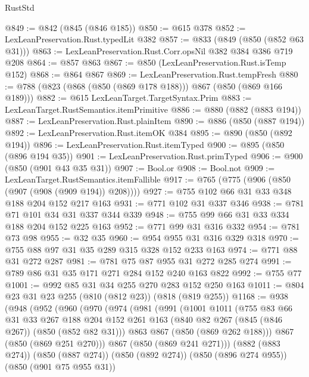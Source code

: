 \begin{lexlean}{RustStd}
\begin{coremodule}
{\begin{coremodule}
{{{{{@849 := @842 (@845 (@846 @185))
@850 := @615 @378
@852 := LexLeanPreservation.Rust.typedLit @382
@857 := @833 (@849 (@850 (@852 @63 @31)))
@863 := LexLeanPreservation.Rust.Corr.opsNil @382 @384 @386 @719 @208
@864 := @857 @863
@867 := @850 (LexLeanPreservation.Rust.isTemp @152)
@868 := @864 @867
@869 := LexLeanPreservation.Rust.tempFresh
@880 := @788 (@823 (@868 (@850 (@869 @178 @188))) @867 (@850 (@869 @166 @189)))
@882 := @615 LexLeanTarget.TargetSyntax.Prim
@883 := LexLeanTarget.RustSemantics.itemPrimitive
@886 := @880 (@882 (@883 @194))
@887 := LexLeanPreservation.Rust.plainItem
@890 := @886 (@850 (@887 @194))
@892 := LexLeanPreservation.Rust.itemOK @384
@895 := @890 (@850 (@892 @194))
@896 := LexLeanPreservation.Rust.itemTyped
@900 := @895 (@850 (@896 @194 @35))
@901 := LexLeanPreservation.Rust.primTyped
@906 := @900 (@850 (@901 @43 @35 @31))
@907 := Bool.or
@908 := Bool.not
@909 := LexLeanTarget.RustSemantics.itemFallible
@917 := @765 (@775 (@906 (@850 (@907 (@908 (@909 @194)) @208))))
@927 := @755 @102 @66 @31 @33 @348 @188 @204 @152 @217 @163
@931 := @771 @102 @31 @337 @346
@938 := @781 @71 @101 @34 @31 @337 @344 @339
@948 := @755 @99 @66 @31 @33 @334 @188 @204 @152 @225 @163
@952 := @771 @99 @31 @316 @332
@954 := @781 @73 @98
@955 := @32 @35
@960 := @954 @955 @31 @316 @329 @318
@970 := @755 @88 @97 @31 @35 @289 @315 @328 @152 @233 @163
@974 := @771 @88 @31 @272 @287
@981 := @781 @75 @87 @955 @31 @272 @285 @274
@991 := @789 @86 @31 @35 @171 @271 @284 @152 @240 @163 @822
@992 := @755 @77
@1001 := @992 @85 @31 @34 @255 @270 @283 @152 @250 @163
@1011 := @804 @23 @31 @23 @255 (@810 (@812 @23)) (@818 (@819 @255))
@1168 := @938
    (@948
      (@952
        (@960
          (@970
            (@974
              (@981
                (@991
                  (@1001
                    @1011
                    (@755
                      @83
                      @66
                      @31
                      @33
                      @267
                      @188
                      @204
                      @152
                      @261
                      @163
                      (@840 @82 @267 (@845 (@846 @267)) (@850 (@852 @82 @31)))
                      @863
                      @867
                      (@850 (@869 @262 @188)))
                    @867
                    (@850 (@869 @251 @270)))
                  @867
                  (@850 (@869 @241 @271)))
                (@882 (@883 @274))
                (@850 (@887 @274))
                (@850 (@892 @274))
                (@850 (@896 @274 @955))
                (@850 (@901 @75 @955 @31))
}}}}}
\end{coremodule}}
\end{coremodule}
\end{lexlean}
